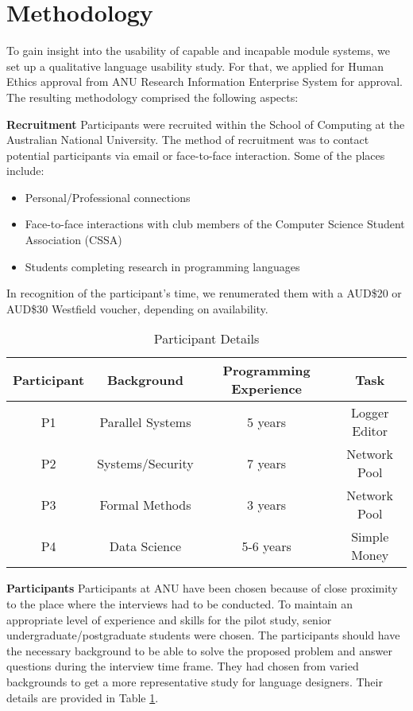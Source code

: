 \section{Methodology}\label{sec-methodology}

\noindent
To gain insight into the usability of capable and incapable module systems, we set up a qualitative language usability study. For that, we applied for Human Ethics approval from ANU Research Information Enterprise System \cite{aries} for approval. The resulting methodology comprised the following aspects: 

\noindent
\textbf{Recruitment} Participants were recruited within the School of Computing at the Australian National University. The method of recruitment was to contact potential participants via email or face-to-face interaction. Some of the places include:
\begin{itemize}
    \item Personal/Professional connections
    \item Face-to-face interactions with club members of the Computer Science Student Association (CSSA)
    \item Students completing research in programming languages 
\end{itemize}

In recognition of the participant's time, we renumerated them with a AUD\$20 or AUD\$30 Westfield voucher, depending on availability.



\vspace{-0.5em}
\begin{table}[h]
\begin{center}
\begin{tabular}{|c|c|c|c|}
\hline
\textbf{Participant} & \textbf{Background} & \textbf{Programming Experience} & \textbf{Task} \\
\hline
P1 & Parallel Systems   & 5 years & Logger Editor \\
P2 & Systems/Security   & 7 years & Network Pool \\
P3 & Formal Methods     & 3 years & Network Pool \\
P4 & Data Science       & 5-6 years & Simple Money \\
\hline
\end{tabular}
\end{center}
\caption{\label{parDet} Participant Details}
\end{table}
\vspace{-1.5em}
\noindent
\textbf{Participants} Participants at ANU have been chosen because of close proximity to the place where the interviews had to be conducted. To maintain an appropriate level of experience and skills for the pilot study, senior undergraduate/postgraduate students were chosen. The participants should have the necessary background to be able to solve the proposed problem and answer questions during the interview time frame. They had chosen from varied backgrounds to get a more representative study for language designers. Their details are provided in Table \ref{parDet}.


